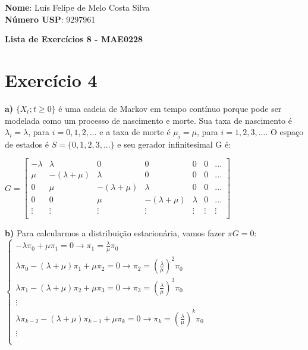 \documentclass[12pt]{article}
\begin{document}
	
	\textbf{Nome}: Luís Felipe de Melo Costa Silva \\
	\textbf{Número USP}: 9297961 
	
	\begin{center}
		\LARGE \bf
		Lista de Exercícios 8 - MAE0228
	\end{center}
	 
	\section*{Exercício 4}
	
	\textbf{a)}  $ \{X_t; t\geq0\} $ é uma cadeia de Markov em tempo contínuo porque pode ser modelada como um processo de nascimento e morte. Sua taxa de nascimento é $ \lambda_i = \lambda $, para $ i = 0, 1, 2, ... $ e a taxa de morte é $ \mu_i = \mu $, para $ i = 1, 2, 3, ... $. O espaço de estados é $ S=\{0, 1, 2, 3, ...\} $ e seu gerador infinitesimal G é:
	
	\begin{center}
		$
		G = \left[\begin{array}{ccccccc}
		          -\lambda  & \lambda          & 0                & 0                & 0       & 0   & ... \\
		          \mu       &  -(\lambda+\mu)  & \lambda          & 0                & 0       & 0   & ... \\
		          0         & \mu              &  -(\lambda+\mu)  & \lambda          & 0       & 0   & ... \\
		          0         & 0                & \mu              &  -(\lambda+\mu)  & \lambda & 0   & ... \\ 
		          \vdots       & \vdots              & \vdots              &  \vdots             & \vdots     & \vdots & \vdots \\
		    \end{array}\right]
		$
	\end{center}
	
	\textbf{b)} Para calcularmos a distribuição estacionária, vamos fazer $ \pi G = 0 $:\\
	
	$ \begin{cases}
		-\lambda \pi_0 + \mu \pi_1 = 0 \to \pi_1 = \frac{\lambda}{\mu} \pi_0\\
		\lambda \pi_0 -(\lambda+\mu) \pi_1 + \mu \pi_2 = 0 \to \pi_2 = \left(\frac{\lambda}{\mu}\right)^2 \pi_0\\
		\lambda \pi_1 -(\lambda+\mu) \pi_2 + \mu \pi_3 = 0 \to \pi_3 = \left(\frac{\lambda}{\mu}\right)^3 \pi_0\\
		\vdots \\
		\lambda \pi_{k-2} -(\lambda+\mu) \pi_{k-1} + \mu \pi_k = 0 \to \pi_k = \left(\frac{\lambda}{\mu}\right)^k \pi_0\\
		\vdots \\ \\
	\end{cases} $
	
\end{document}
